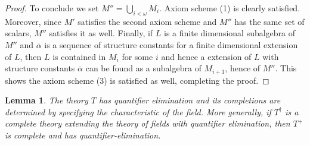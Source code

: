 \documentclass[psamsfonts]{amsart}
\newtheorem{lem}[thm]{Lemma}
\theoremstyle{definition}
\theoremstyle{definition}
\theoremstyle{remark}
\numberwithin{equation}{section}
\begin{document}
\begin{proof}
    To conclude we set $M'' = \bigcup_{i < \omega} M_{i}$. Axiom scheme (1) is clearly satisfied.  Moreover, since $M'$ satisfies the second axiom scheme and $M''$ has the same set of scalars, $M''$ satisfies it as well.  Finally, if $L$ is a finite dimensional subalgebra of $M''$ and $\overline{\alpha}$ is a sequence of structure constants for a finite dimensional extension of $L$, then $L$ is contained in $M_{i}$ for some $i$ and hence a extension of $L$ with structure constants $\overline{\alpha}$ can be found as a subalgebra of $M_{i+1}$, hence of $M''$. This shows the axiom scheme (3) is satisfied as well, completing the proof. 
\end{proof}

\begin{lem}
    The theory $T$ has quantifier elimination and its completions are determined by specifying the characteristic of the field.  More generally, if $T^{\dagger}$ is a complete theory extending the theory of fields with quantifier elimination, then $T^{+}$ is complete and has quantifier-elimination.  
\end{lem}
\end{document}
